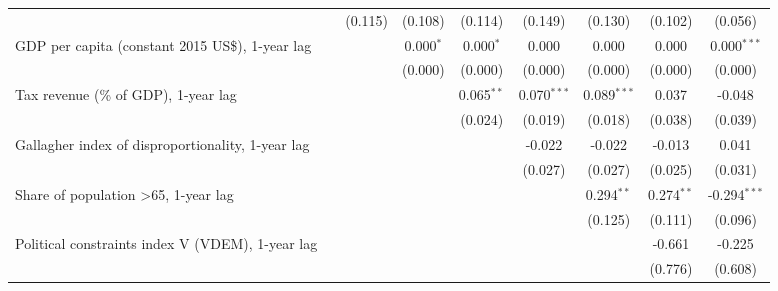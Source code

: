 \begin{table}[htbp]
\begin{tabular}{lcccccccc}
                                                                                                       &         & (0.115) & (0.108)     & (0.114)      & (0.149)       & (0.130)       & (0.102)      & (0.056)\\   
      GDP per capita (constant 2015 US\$), 1-year lag                                                  &         &         & 0.000$^{*}$ & 0.000$^{*}$  & 0.000         & 0.000         & 0.000        & 0.000$^{***}$\\   
                                                                                                       &         &         & (0.000)     & (0.000)      & (0.000)       & (0.000)       & (0.000)      & (0.000)\\   
      Tax revenue (\% of GDP), 1-year lag                                                              &         &         &             & 0.065$^{**}$ & 0.070$^{***}$ & 0.089$^{***}$ & 0.037        & -0.048\\   
                                                                                                       &         &         &             & (0.024)      & (0.019)       & (0.018)       & (0.038)      & (0.039)\\   
      Gallagher index of disproportionality, 1-year lag                                                &         &         &             &              & -0.022        & -0.022        & -0.013       & 0.041\\   
                                                                                                       &         &         &             &              & (0.027)       & (0.027)       & (0.025)      & (0.031)\\   
      Share of population >65, 1-year lag                                                              &         &         &             &              &               & 0.294$^{**}$  & 0.274$^{**}$ & -0.294$^{***}$\\   
                                                                                                       &         &         &             &              &               & (0.125)       & (0.111)      & (0.096)\\   
      Political constraints index V (VDEM), 1-year lag                                                 &         &         &             &              &               &               & -0.661       & -0.225\\   
                                                                                                       &         &         &             &              &               &               & (0.776)      & (0.608)\\   

\end{tabular}
\end{table}
